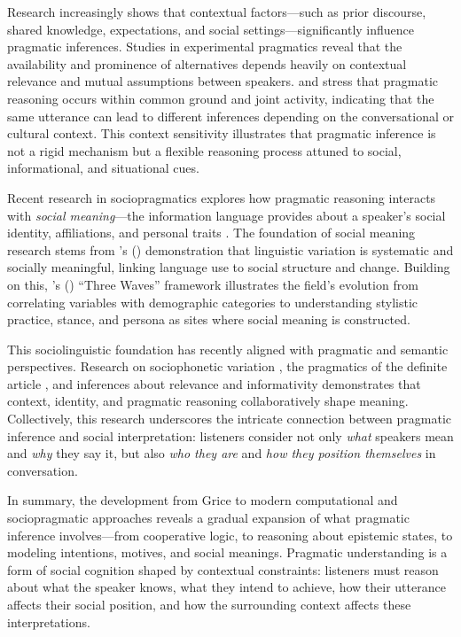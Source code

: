 \documentclass[12pt,a4paper]{article}
\begin{document}
Research increasingly shows that contextual factors---such as prior discourse,
shared knowledge, expectations, and social settings---significantly influence
pragmatic inferences. Studies in experimental pragmatics
\citep[e.g.,][]{BrehenyKatsosWilliams2006,DegenTanenhaus2015} reveal that the
availability and prominence of alternatives depends heavily on contextual
relevance and mutual assumptions between speakers. \citet{vanRooij2003} and
\citet{Clark1996} stress that pragmatic reasoning occurs within common ground
and joint activity, indicating that the same utterance can lead to different
inferences depending on the conversational or cultural context. This context
sensitivity illustrates that pragmatic inference is not a rigid mechanism but a
flexible reasoning process attuned to social, informational, and situational
cues.

Recent research in sociopragmatics explores how pragmatic reasoning interacts
with \emph{social meaning}---the information language provides about a speaker's
social identity, affiliations, and personal traits \citep{Eckert2008,Podesva2011,Silverstein2003}. The foundation of social meaning research stems from \citeauthor{Labov1972}'s
(\citeyear{Labov1972}) demonstration that linguistic variation is systematic and
socially meaningful, linking language use to social structure and change. Building
on this, \citeauthor{Eckert2012}'s (\citeyear{Eckert2012}) ``Three Waves''
framework illustrates the field's evolution from correlating variables with
demographic categories to understanding stylistic practice, stance, and persona
as sites where social meaning is constructed.

This sociolinguistic foundation has recently aligned with pragmatic and semantic
perspectives. Research on sociophonetic variation \citep{burnett2017,burnett2019,burnett2023,burnett2025},
the pragmatics of the definite article \citep{Acton2019}, and inferences about
relevance and informativity \citep{beltramapapafragou2023} demonstrates that
context, identity, and pragmatic reasoning collaboratively shape meaning.
Collectively, this research underscores the intricate connection between
pragmatic inference and social interpretation: listeners consider not only
\emph{what} speakers mean and \emph{why} they say it, but also \emph{who they
are} and \emph{how they position themselves} in conversation.

In summary, the development from Grice to modern computational and
sociopragmatic approaches reveals a gradual expansion of what pragmatic
inference involves---from cooperative logic, to reasoning about epistemic states,
to modeling intentions, motives, and social meanings. Pragmatic understanding is
a form of social cognition shaped by contextual constraints: listeners must
reason about what the speaker knows, what they intend to achieve, how their
utterance affects their social position, and how the surrounding context affects
these interpretations.
\end{document}

